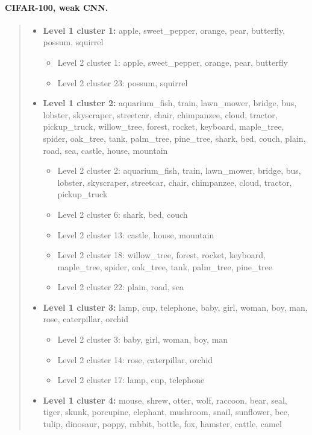 \paragraph{CIFAR-100, weak CNN.}
\begin{quote}
\footnotesize
\raggedright
\begin{itemize}
\setlength{\itemsep}{0.2em}
\item \textbf{Level 1 cluster 1:} apple, sweet\_pepper, orange, pear, butterfly, possum, squirrel
\begin{itemize}
\setlength{\itemsep}{0.1em}
\item Level 2 cluster 1: apple, sweet\_pepper, orange, pear, butterfly
\item Level 2 cluster 23: possum, squirrel
\end{itemize}
\item \textbf{Level 1 cluster 2:} aquarium\_fish, train, lawn\_mower, bridge, bus, lobster, skyscraper, streetcar, chair, chimpanzee, cloud, tractor, pickup\_truck, willow\_tree, forest, rocket, keyboard, maple\_tree, spider, oak\_tree, tank, palm\_tree, pine\_tree, shark, bed, couch, plain, road, sea, castle, house, mountain
\begin{itemize}
\setlength{\itemsep}{0.1em}
\item Level 2 cluster 2: aquarium\_fish, train, lawn\_mower, bridge, bus, lobster, skyscraper, streetcar, chair, chimpanzee, cloud, tractor, pickup\_truck
\item Level 2 cluster 6: shark, bed, couch
\item Level 2 cluster 13: castle, house, mountain
\item Level 2 cluster 18: willow\_tree, forest, rocket, keyboard, maple\_tree, spider, oak\_tree, tank, palm\_tree, pine\_tree
\item Level 2 cluster 22: plain, road, sea
\end{itemize}
\item \textbf{Level 1 cluster 3:} lamp, cup, telephone, baby, girl, woman, boy, man, rose, caterpillar, orchid
\begin{itemize}
\setlength{\itemsep}{0.1em}
\item Level 2 cluster 3: baby, girl, woman, boy, man
\item Level 2 cluster 14: rose, caterpillar, orchid
\item Level 2 cluster 17: lamp, cup, telephone
\end{itemize}
\item \textbf{Level 1 cluster 4:} mouse, shrew, otter, wolf, raccoon, bear, seal, tiger, skunk, porcupine, elephant, mushroom, snail, sunflower, bee, tulip, dinosaur, poppy, rabbit, bottle, fox, hamster, cattle, camel

\end{itemize}
\end{quote}
